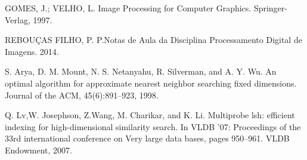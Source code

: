 \documentclass[letterpaper, 10 pt, conference]{ieeeconf}  %
\begin{document}
\begin{thebibliography}{1}
GOMES, J.; VELHO, L. Image Processing for Computer Graphics. Springer-Verlag, 1997. 

REBOUÇAS FILHO, P. P.Notas de Aula da Disciplina Processamento Digital de Imagens. 2014. 

S. Arya, D. M. Mount, N. S. Netanyahu, R. Silverman, and A. Y. Wu. An optimal algorithm for approximate nearest neighbor searching fixed dimensions. Journal of the ACM, 45(6):891–923, 1998.

Q. Lv,W. Josephson, Z.Wang, M. Charikar, and K. Li. Multiprobe lsh: efficient indexing for high-dimensional similarity search. In VLDB ’07: Proceedings of the 33rd international conference on Very large data bases, pages 950–961. VLDB Endowment, 2007.

\end{thebibliography}
\end{document}
